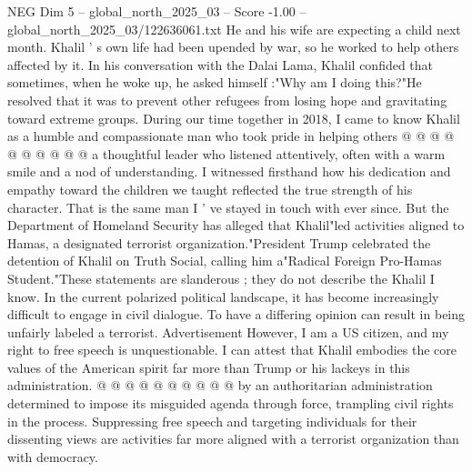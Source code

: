 \begin{textsample}{NEG Dim 5 – global\_north\_2025\_03 – Score -1.00 – global\_north\_2025\_03/122636061.txt}
He and his wife are expecting a child next month.
Khalil ' s own life had been upended by war, so he worked to help others affected by it.
In his conversation with the Dalai Lama, Khalil confided that sometimes, when he woke up, he asked himself :"Why am I doing this?"He resolved that it was to prevent other refugees from losing hope and gravitating toward extreme groups.
During our time together in 2018, I came to know Khalil as a humble and compassionate man who took pride in helping others @ @ @ @ @ @ @ @ @ @ a thoughtful leader who listened attentively, often with a warm smile and a nod of understanding.
I witnessed firsthand how his dedication and empathy toward the children we taught reflected the true strength of his character.
That is the same man I ' ve stayed in touch with ever since.
But the Department of Homeland Security has alleged that Khalil"led activities aligned to Hamas, a designated terrorist organization."President Trump celebrated the detention of Khalil on Truth Social, calling him a"Radical Foreign Pro-Hamas Student."These statements are slanderous ; they do not describe the Khalil I know.
In the current polarized political landscape, it has become increasingly difficult to engage in civil dialogue.
To have a differing opinion can result in being unfairly labeled a terrorist.
Advertisement However, I am a US citizen, and my right to free speech is unquestionable.
I can attest that Khalil embodies the core values of the American spirit far more than Trump or his lackeys in this administration. @ @ @ @ @ @ @ @ @ @ by an authoritarian administration determined to impose its misguided agenda through force, trampling civil rights in the process.
Suppressing free speech and targeting individuals for their dissenting views are activities far more aligned with a terrorist organization than with democracy.

\end{textsample}
